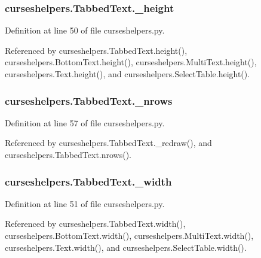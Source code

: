 \subsubsection[{\-\_\-height}]{\setlength{\rightskip}{0pt plus 5cm}curseshelpers.\-Tabbed\-Text.\-\_\-height\hspace{0.3cm}{\ttfamily [private]}}\label{classcurseshelpers_1_1TabbedText_aef8f97a70ffe232d5870620d508efdef}


Definition at line 50 of file curseshelpers.\-py.



Referenced by curseshelpers.\-Tabbed\-Text.\-height(), curseshelpers.\-Bottom\-Text.\-height(), curseshelpers.\-Multi\-Text.\-height(), curseshelpers.\-Text.\-height(), and curseshelpers.\-Select\-Table.\-height().

\subsubsection[{\-\_\-nrows}]{\setlength{\rightskip}{0pt plus 5cm}curseshelpers.\-Tabbed\-Text.\-\_\-nrows\hspace{0.3cm}{\ttfamily [private]}}\label{classcurseshelpers_1_1TabbedText_a0da10da4cf0016587017d394cb786dce}


Definition at line 57 of file curseshelpers.\-py.



Referenced by curseshelpers.\-Tabbed\-Text.\-\_\-redraw(), and curseshelpers.\-Tabbed\-Text.\-nrows().

\subsubsection[{\-\_\-width}]{\setlength{\rightskip}{0pt plus 5cm}curseshelpers.\-Tabbed\-Text.\-\_\-width\hspace{0.3cm}{\ttfamily [private]}}\label{classcurseshelpers_1_1TabbedText_a90bd899074e31cd69893192f4514d88b}


Definition at line 51 of file curseshelpers.\-py.



Referenced by curseshelpers.\-Tabbed\-Text.\-width(), curseshelpers.\-Bottom\-Text.\-width(), curseshelpers.\-Multi\-Text.\-width(), curseshelpers.\-Text.\-width(), and curseshelpers.\-Select\-Table.\-width().

